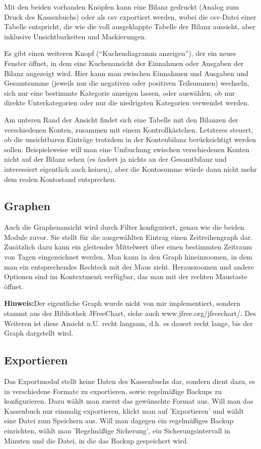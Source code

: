 \documentclass[a4paper,10pt,halfparskip,oneside,smallheadings]{scrbook}
\begin{document}
Mit den beiden vorhanden Knöpfen kann eine Bilanz gedruckt (Analog zum Druck des Kassenbuchs) oder als csv exportiert werden, wobei die csv-Datei einer Tabelle entspricht, die wie die voll ausgeklappte Tabelle der Bilanz aussieht, aber inklusive Unsichtbarkeiten und Maskierungen.

Es gibt einen weiteren Knopf (``Kuchendiagramm anzeigen''), der ein neues Fenster öffnet, in dem eine Kuchenansicht der Einnahmen oder Ausgaben der Bilanz angezeigt wird. Hier kann man zwischen Einnahmen und Ausgaben und Gesamtsumme (jeweils nur die negativen oder positiven Teilsummen) wechseln, sich nur eine bestimmte Kategorie anzeigen lassen, oder auswählen, ob nur direkte Unterkategorien oder nur die niedrigsten Kategorien verwendet werden.

Am unteren Rand der Ansicht findet sich eine Tabelle mit den Bilanzen der verschiedenen Konten, zusammen mit einem Kontrollkästchen. Letzteres steuert, ob die unsichtbaren Einträge trotzdem in der Kontenbilanz berücksichtigt werden sollen. Beispielsweise will man eine Umbuchung zwischen verschiedenen Konten nicht auf der Bilanz sehen (es ändert ja nichts an der Gesamtbilanz und interessiert eigentlich auch keinen), aber die Kontosumme würde dann nicht mehr dem realen Kontostand entsprechen.

\subsection{Graphen}
Auch die Graphenansicht wird durch Filter konfiguriert, genau wie die beiden Module zuvor. Sie stellt für die ausgewählten Eintrag einen Zeitreihengraph dar. Zusätzlich dazu kann ein gleitender Mittelwert über einen bestimmten Zeitraum von Tagen eingezeichnet werden. Man kann in den Graph hineinzoomen, in dem man ein entsprechendes Rechteck mit der Maus zieht. Herauszoomen und andere Optionen sind im Kontextmenü verfügbar, das man mit der rechten Maustaste öffnet.

\textbf{Hinweis:}Der eigentliche Graph wurde nicht von mir implementiert, sondern stammt aus der Bibliothek JFreeChart, siehe auch www.jfree.org/jfreechart/. Des Weiteren ist diese Ansicht u.U. recht langsam, d.h. es dauert recht lange, bis der Graph dargstellt wird.

\subsection{Exportieren}
Das Exportmodul stellt keine Daten des Kassenbuchs dar, sondern dient dazu, es in verschiedene Formate zu exportieren, sowie regelmäßige Backups zu konfigurieren. Dazu wählt man zuerst das gewünschte Format aus. Will man das Kassenbuch nur einmalig exportieren, klickt man auf 'Exportieren' und wählt eine Datei zum Speichern aus. Will man dagegen ein regelmäßiges Backup einrichten, wählt man 'Regelmäßige Sicherung', ein Sicherungsintervall in Minuten und die Datei, in die das Backup gespeichert wird. 
\end{document}

